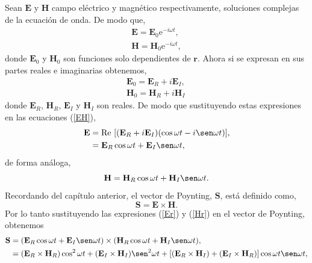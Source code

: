 \documentclass[11pt,fleqn]{book} %
\begin{document}
Sean $\textbf{E}$ y $\textbf{H}$ campo el\'ectrico y magn\'etico respectivamente, soluciones complejas de la ecuaci\'on de onda. De modo que,
\begin{equation} \label{EH}
\begin{split}
 \textbf{E}=\textbf{E}_{0} \text{e}^{-i \omega t},\\
 \textbf{H}=\textbf{H}_{0} \text{e}^{-i \omega t},
\end{split}
 \end{equation}
donde $\textbf{E}_0$ y $\textbf{H}_0$ son funciones solo dependientes de $\textbf{r}$. Ahora si se expresan en sus partes reales e imaginarias obtenemos,
\begin{equation*}
\begin{split}
 \textbf{E}_0=\textbf{E}_R+i\textbf{E}_I,\\ \textbf{H}_0=\textbf{H}_R+i\textbf{H}_I\,
\end{split}
 \end{equation*}
donde $\textbf{E}_R$, $\textbf{H}_R$, $\textbf{E}_I$ y $\textbf{H}_I$ son reales. De modo que sustituyendo estas expresiones en las ecuaciones (\ref{EH}),
\begin{equation} \label{Er}
\begin{split}
\textbf{E}&= \text{Re }[(\textbf{E}_R+i\textbf{E}_I)(\cos\omega t-i\sen\omega t)],\\
&=\textbf{E}_R\cos\omega t+\textbf{E}_I\sen\omega t,
\end{split}
 \end{equation}
de forma an\'aloga,
\begin{equation}\label{Hr}
\textbf{H}=\textbf{H}_R\cos\omega t+\textbf{H}_I\sen\omega t.
\end{equation}
Recordando del cap\'itulo anterior, el vector de Poynting, $\textbf{S}$, est\'a definido como,
\begin{equation}
\textbf{S}=\textbf{E} \times \textbf{H}.
\end{equation}
Por lo tanto sustituyendo las expresiones (\ref{Er}) y (\ref{Hr}) en el vector de Poynting, obtenemos
\begin{equation}
\begin{split}
\textbf{S}&=(\textbf{E}_R\cos\omega t+\textbf{E}_I\sen\omega t)\times (\textbf{H}_R\cos\omega t+\textbf{H}_I\sen\omega t),\\
&=(\textbf{E}_R\times\textbf{H}_R)\cos^{2}\omega t+(\textbf{E}_I\times \textbf{H}_I)\sen^{2} \omega t+[(\textbf{E}_R\times \textbf{H}_I)+(\textbf{E}_I\times \textbf{H}_R)]\cos \omega t \sen\omega t,
\end{split}
\end{equation}
\end{document}
